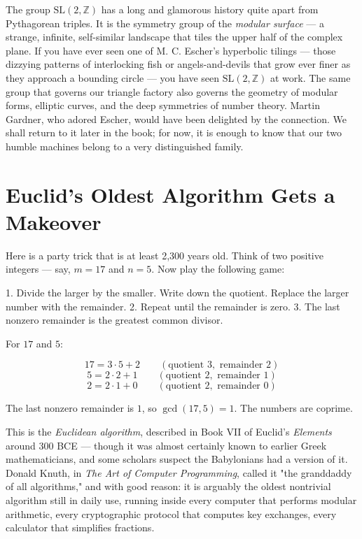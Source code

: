\documentclass[11pt,openright,twoside]{book}
\theoremstyle{definition}
\begin{document}
The group $\mathrm{SL}(2, \mathbb{Z})$ has a long and glamorous history quite apart from Pythagorean triples. It is the symmetry group of the \textit{modular surface} --- a strange, infinite, self-similar landscape that tiles the upper half of the complex plane. If you have ever seen one of M. C. Escher's hyperbolic tilings --- those dizzying patterns of interlocking fish or angels-and-devils that grow ever finer as they approach a bounding circle --- you have seen $\mathrm{SL}(2, \mathbb{Z})$ at work. The same group that governs our triangle factory also governs the geometry of modular forms, elliptic curves, and the deep symmetries of number theory. Martin Gardner, who adored Escher, would have been delighted by the connection. We shall return to it later in the book; for now, it is enough to know that our two humble machines belong to a very distinguished family.


\bigskip


\section{Euclid's Oldest Algorithm Gets a Makeover}

Here is a party trick that is at least 2,300 years old. Think of two positive integers --- say, $m = 17$ and $n = 5$. Now play the following game:

1. Divide the larger by the smaller. Write down the quotient. Replace the larger number with the remainder.
2. Repeat until the remainder is zero.
3. The last nonzero remainder is the greatest common divisor.

For $17$ and $5$:

\[
17 = 3 \cdot 5 + 2 \qquad (\text{quotient } 3, \text{ remainder } 2)
\]
\[
5 = 2 \cdot 2 + 1 \qquad (\text{quotient } 2, \text{ remainder } 1)
\]
\[
2 = 2 \cdot 1 + 0 \qquad (\text{quotient } 2, \text{ remainder } 0)
\]

The last nonzero remainder is $1$, so $\gcd(17, 5) = 1$. The numbers are coprime.

This is the \textit{Euclidean algorithm}, described in Book VII of Euclid's \textit{Elements} around 300 BCE --- though it was almost certainly known to earlier Greek mathematicians, and some scholars suspect the Babylonians had a version of it. Donald Knuth, in \textit{The Art of Computer Programming}, called it "the granddaddy of all algorithms," and with good reason: it is arguably the oldest nontrivial algorithm still in daily use, running inside every computer that performs modular arithmetic, every cryptographic protocol that computes key exchanges, every calculator that simplifies fractions.
\end{document}
